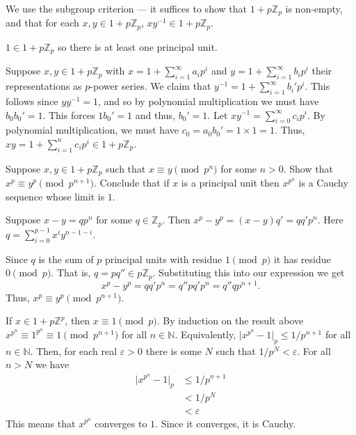 \documentclass[12 pt, letterpaper]{hmcpset}
\begin{document}
\begin{solution}
	We use the subgroup criterion --- it suffices to show that $1 + p \mathbb{Z}_{p}$ is non-empty, and that for each $x, y \in 1 + p \mathbb{Z}_{p}$, $x y^{-1} \in 1 + p \mathbb{Z}_{p}$.

	$1 \in 1 + p \mathbb{Z}_{p}$ so there is at least one principal unit.

	Suppose $x, y \in 1 + p \mathbb{Z}_{p}$ with  $x = 1 + \sum_{i = 1}^{\infty} a_{i} p^{i}$ and $y = 1 + \sum_{i = 1}^{\infty} b_{i} p^{i}$ their representations as $p$-power series. We claim that $y^{-1} = 1 + \sum_{i = 1}^{\infty} b_{i}' p^{i}$. This follows since $y y^{-1} = 1$, and so by polynomial multiplication we must have $b_{0} b_{0}' = 1$. This forces $1 b_{0}' = 1$ and thus, $b_{0}' = 1$. Let $xy^{-1} = \sum_{i = 0}^{\infty} c_{i} p^{i}$. By polynomial multiplication, we must have $c_{0} = a_{0} b_{0}' = 1 \times 1 = 1$. Thus, $xy = 1 + \sum_{i = 1}^{n} c_{i} p^{i} \in 1 + p \mathbb{Z}_{p}$.
\end{solution}

\pagebreak

\begin{problem}[(6)]
	Suppose $x, y \in 1 + p \mathbb{Z}_{p}$ such that $x \equiv y \pmod{p^{n}}$ for some $n > 0$. Show that $x^{p} \equiv y^{p} \pmod{p^{n + 1}}$. Conclude that if $x$ is a principal unit then $x^{p^{n}}$ is a Cauchy sequence whose limit is $1$.
\end{problem}

\begin{solution}
	Suppose $x - y = q p^{n}$ for some $q \in \mathbb{Z}_{p}$. Then $x^{p} - y^{p} = (x - y)q' = q q'p^{n}$. Here $q = \sum_{i = 0}^{p - 1} x^{i} y^{n - 1 - i}$. 

	Since $q$ is the sum of $p$ principal units with residue $1 \pmod p$ it has residue $0 \pmod p$. That is, $q = p q'' \in p \mathbb{Z}_{p}$. Substituting this into our expression we get
	\[
		x^{p} - y^{p} = q q' p^{n} = q'' p q' p^{n} = q'' q p^{n + 1}.
	\]
	Thus, $x^{p} \equiv y^{p} \pmod{p^{n + 1}}$.

	If  $x \in 1 + p \mathbb{Z}^{p}$, then $x \equiv 1 \pmod{p}$. By induction on the result above $x^{p^{n}} \equiv 1^{p^{n}} \equiv 1 \pmod{p^{n + 1}}$ for all $n \in \mathbb{N}$. Equivalently, $\lvert x^{p^{n}} - 1 \rvert_{p} \le 1 / p^{n + 1}$ for all $n \in \mathbb{N}$. Then, for each real $\varepsilon > 0$ there is some $N$ such that $1 / p^{N} < \varepsilon$. For all $n > N$ we have
	 \begin{align*}
		 \lvert x^{p^{n}} - 1 \rvert_{p} & \le 1 / p^{n + 1} \\
						 & < 1 / p^{N} \\
						 & < \varepsilon
	\end{align*}
	This means that $x^{p^{n}}$ converges to $1$. Since it converges, it is Cauchy.
\end{solution}
\end{document}
